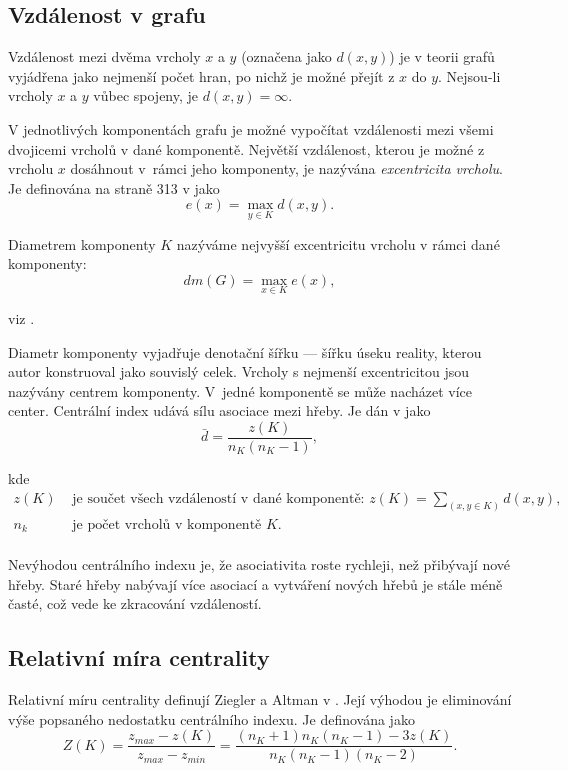 \documentclass[dp.tex]{subfiles}
\begin{document}
\subsection{Vzdálenost v grafu}
Vzdálenost mezi dvěma vrcholy $x$ a $y$ (označena jako $d(x,y)$) je v teorii grafů vyjádřena jako nejmenší počet hran, po nichž je možné přejít z $x$ do $y$. Nejsou-li vrcholy $x$ a $y$ vůbec spojeny, je $d(x,y)=\infty$.

V jednotlivých komponentách grafu je možné vypočítat vzdálenosti mezi všemi dvojicemi vrcholů v dané komponentě. Největší vzdálenost, kterou je možné z  vrcholu $x$ dosáhnout v~rámci jeho komponenty, je nazývána \textit{excentricita vrcholu}. Je definována na straně 313 v \cite{Wimmer2003} jako
\begin{equation}
e(x)=\max_{y \in K} d(x,y).
\end{equation}

Diametrem komponenty $K$ nazýváme nejvyšší excentricitu vrcholu v rámci dané komponenty:
\begin{equation}
dm(G)=\max_{x \in K} e(x),
\end{equation}

viz \cite[str. 315]{Wimmer2003}.

Diametr komponenty vyjadřuje denotační šířku --- šířku úseku reality, kterou autor konstruoval jako souvislý celek. Vrcholy s nejmenší excentricitou jsou nazývány centrem komponenty. V~jedné komponentě se může nacházet více center.
Centrální index udává sílu asociace mezi hřeby. Je dán v \cite[str. 315]{Wimmer2003} jako
\begin{equation}
\bar{d}=\frac{z(K)}{n_K (n_K-1)},
\end{equation}

kde
\begin{align*}
	z(K) & \text{ je součet všech vzdáleností v dané komponentě: 
$z(K)=\sum_{(x,y \in K)} d(x,y)$,}\\
	n_k & \text{ je počet vrcholů v komponentě $K$.}\\
\end{align*} 

Nevýhodou centrálního indexu je, že asociativita roste rychleji, než přibývají nové hřeby. Staré hřeby nabývají více asociací a vytváření nových hřebů je stále méně časté, což vede ke zkracování vzdáleností.


\subsection{Relativní míra centrality}
Relativní míru centrality definují Ziegler a Altman v \cite[str. 315]{ZieglerAltmann2002}. Její výhodou je eliminování výše popsaného nedostatku centrálního indexu. Je definována jako
\begin{equation}
Z(K)=\frac{z_{max}-z(K)}{z_{max}-z_{min}}=
\frac{(n_K+1) n_K (n_K-1)-3z(K)}{n_K (n_K-1)(n_K-2)} .
\end{equation}
\end{document}
